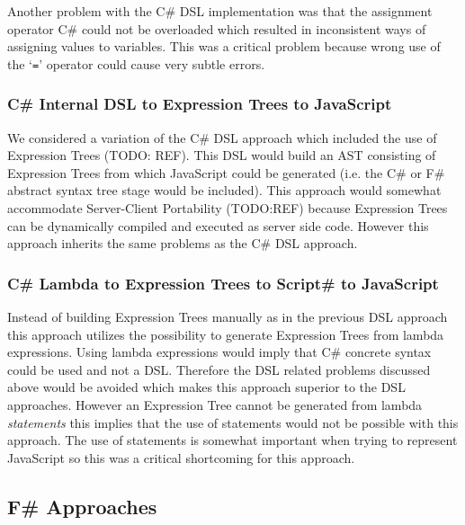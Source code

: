 			Another problem with the C\# DSL implementation was that the assignment operator C\# could not be overloaded which resulted in inconsistent ways of assigning values to variables. This was a critical problem because wrong use of the ‘\texttt{=}’ operator could cause very subtle errors.


		\subsubsection{C\# Internal DSL to Expression Trees to JavaScript} %
		\label{ssub:c_internal_dsl_to_expression_trees_to_javascript}
			We considered a variation of the C\# DSL approach which included the use of Expression Trees (TODO: REF). This DSL would build an AST consisting of Expression Trees from which JavaScript could be generated (i.e. the C\# or F\# abstract syntax tree stage would be included). This approach would somewhat accommodate Server-Client Portability (TODO:REF) because Expression Trees can be dynamically compiled and executed as server side code. However this approach inherits the same problems as the C\# DSL approach.

		\subsubsection{C\# Lambda to Expression Trees to Script\# to JavaScript} %
		\label{ssub:c_lambda_to_expression_trees_to_script_to_javascript}
			Instead of building Expression Trees manually as in the previous DSL approach this approach utilizes the possibility to generate Expression Trees from lambda expressions. Using lambda expressions would imply that C\# concrete syntax could be used and not a DSL. Therefore the DSL related problems discussed above would be avoided which makes this approach superior to the DSL approaches. However an Expression Tree cannot be generated from lambda \emph{statements} this implies that the use of statements would not be possible with this approach. The use of statements is somewhat important when trying to represent JavaScript so this was a critical shortcoming for this approach.


	\subsection{F\# Approaches} %
	\label{sub:f_approaches}
	
